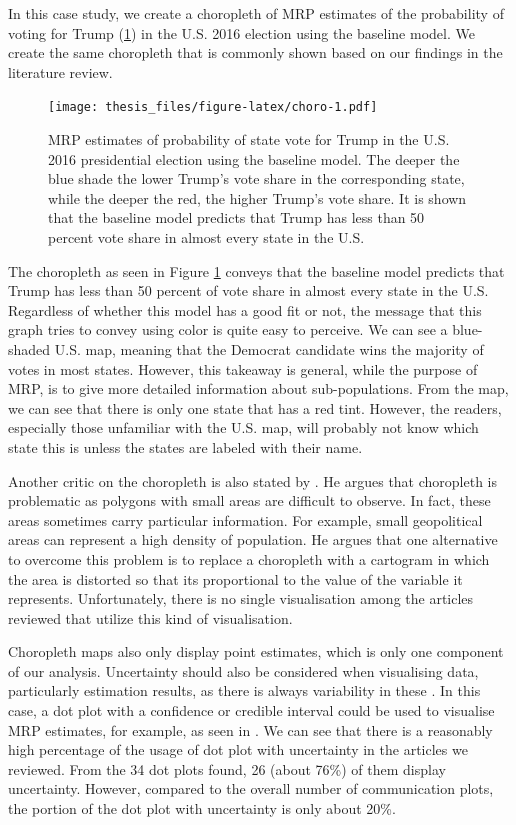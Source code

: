 \documentclass{monashthesis}
\begin{document}
In this case study, we create a choropleth of MRP estimates of the probability of voting for Trump (\ref{fig:choro}) in the U.S. 2016 election using the baseline model. We create the same choropleth that is commonly shown based on our findings in the literature review.

\begin{figure}
\centering
\texttt{[image: thesis\_files/figure-latex/choro-1.pdf]}
\caption{\label{fig:choro}MRP estimates of probability of state vote for Trump in the U.S. 2016 presidential election using the baseline model. The deeper the blue shade the lower Trump's vote share in the corresponding state, while the deeper the red, the higher Trump's vote share. It is shown that the baseline model predicts that Trump has less than 50 percent vote share in almost every state in the U.S.}
\end{figure}

The choropleth as seen in Figure \ref{fig:choro} conveys that the baseline model predicts that Trump has less than 50 percent of vote share in almost every state in the U.S. Regardless of whether this model has a good fit or not, the message that this graph tries to convey using color is quite easy to perceive. We can see a blue-shaded U.S. map, meaning that the Democrat candidate wins the majority of votes in most states. However, this takeaway is general, while the purpose of MRP, is to give more detailed information about sub-populations. From the map, we can see that there is only one state that has a red tint. However, the readers, especially those unfamiliar with the U.S. map, will probably not know which state this is unless the states are labeled with their name.

Another critic on the choropleth is also stated by \textcite{statgraph}. He argues that choropleth is problematic as polygons with small areas are difficult to observe. In fact, these areas sometimes carry particular information. For example, small geopolitical areas can represent a high density of population. He argues that one alternative to overcome this problem is to replace a choropleth with a cartogram in which the area is distorted so that its proportional to the value of the variable it represents. Unfortunately, there is no single visualisation among the articles reviewed that utilize this kind of visualisation.

Choropleth maps also only display point estimates, which is only one component of our analysis. Uncertainty should also be considered when visualising data, particularly estimation results, as there is always variability in these \autocite{tukey,MIDWAY2020100141,HullmanJessica2019IPoE}. In this case, a dot plot with a confidence or credible interval could be used to visualise MRP estimates, for example, as seen in \textcite{EnnsPeterK2013POit}. We can see that there is a reasonably high percentage of the usage of dot plot with uncertainty in the articles we reviewed. From the 34 dot plots found, 26 (about 76\%) of them display uncertainty. However, compared to the overall number of communication plots, the portion of the dot plot with uncertainty is only about 20\%.
\end{document}
